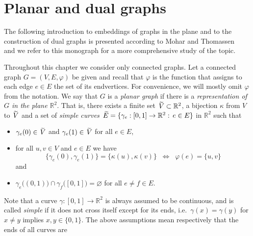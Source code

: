 \documentclass{dis}
\theoremstyle{citing}
\begin{document}
\section{Planar and dual graphs} \label{sec:5_embeddings}

The following introduction to embeddings of graphs in the plane 
and to the construction of dual graphs is presented 
according to Mohar and Thomassen~\cite{Mohar} and we refer 
to this monograph for a more comprehensive study of the topic.

Throughout this chapter we consider only connected graphs. 
Let a connected graph $G=(V,E,\varphi)$ be given and recall that 
$\varphi$ is the function that 
assigns to each edge $e\in E$ the set of its endvertices. 
For convenience, we will mostly omit $\varphi$ from the 
notation. 
We say that $G$ is a 
\emph{planar graph}
if there is a 
\emph{representation of $G$ in the plane ${\ensuremath{\mathbb{R}}}^2$}.
That is, there exists a finite set ${\,\raisebox{2pt}{ ${\widetilde{{}}}$ }\mkern-13mu V}\subset{\ensuremath{\mathbb{R}}}^2$, 
a bijection $\kappa$ from $V$ to ${\,\raisebox{2pt}{ ${\widetilde{{}}}$ }\mkern-13mu V}$ 
and a set of 
\emph{simple curves} 
$\,{\,\raisebox{2pt}{ ${\widetilde{{}}}$ }\mkern-15mu E}=\{{\gamma}_e:[0,1]\to{\ensuremath{\mathbb{R}}}^2:\, e\in E\}$ in ${\ensuremath{\mathbb{R}}}^2$ such that 
\vspace{1mm}
\begin{itemize}
	\item ${\gamma}_e(0)\in{\,\raisebox{2pt}{ ${\widetilde{{}}}$ }\mkern-13mu V}$ and ${\gamma}_e(1)\in{\,\raisebox{2pt}{ ${\widetilde{{}}}$ }\mkern-13mu V}$ for all $e\in E$,
		\vspace{1mm}
	\item for all $u,v\in V$ and $e\in E$ we have 
				\[
				\bigl\{{\gamma}_e(0), {\gamma}_e(1)\bigr\}
								=\bigl\{\kappa(u),\kappa(v)\bigr\}
				\;\;\Longleftrightarrow\;\; 
				\varphi(e)=\{u,v\} 
				\]
		and 
		\vspace{1mm}
	\item ${\gamma}_e\bigl((0,1)\bigr)\cap{\gamma}_f\bigl([0,1]\bigr)=\varnothing$ 
					for all $e\neq f\in E$.
\end{itemize}
Note that a curve ${\gamma}:[0,1]\to{\ensuremath{\mathbb{R}}}^2$ is always assumed to be 
continuous, and is called 
\emph{simple} 
if it does not cross itself except for its ends, 
i.e.~${\gamma}(x)={\gamma}(y)$ for $x\neq y$ implies $x,y\in\{0,1\}$.
The above assumptions mean respectively that the ends of all curves are 
\end{document}
